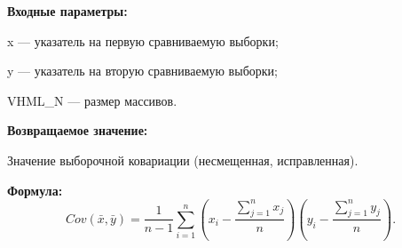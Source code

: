 \textbf{Входные параметры:}
 
x --- указатель на первую сравниваемую выборки;
 
y --- указатель на вторую сравниваемую выборки;
 
VHML\_N --- размер массивов.

\textbf{Возвращаемое значение:}
 
Значение выборочной ковариации (несмещенная, исправленная).

\textbf{Формула:}
\begin{equation*}
Cov\left(\bar{x},\bar{y} \right)= \dfrac{1}{n-1}\sum_{i=1}^{n} \left( x_i-\dfrac{\sum_{j=1}^{n}x_j}{n}\right)\left( y_i-\dfrac{\sum_{j=1}^{n}y_j}{n}\right) .
\end{equation*}
